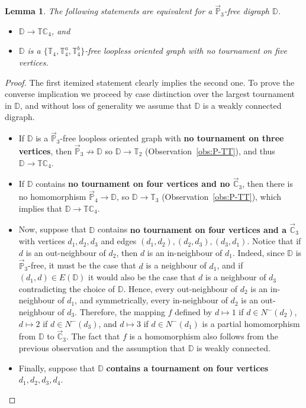 \documentclass{article}
\newtheorem{lemma}[theorem]{Lemma}
\theoremstyle{definition}
\theoremstyle{remark}
\newcommand{\bC}{{\mathbb C}}
\newcommand{\bD}{{\mathbb D}}
\newcommand{\bP}{{\mathbb P}}
\newcommand{\bT}{{\mathbb T}}
\begin{document}
\begin{lemma}\label{lem:TC4-min-obs}
    The following statements are equivalent for a $\vec{\bP}_3$-free digraph $\bD$.
    \begin{itemize}
        \item $\bD\to \bT\bC_4$, and
        \item $\bD$ is a $\{\bT_4,\bT_4^a, \bT_4^b\}$-free loopless oriented graph with no tournament
        on five vertices.
    \end{itemize}
\end{lemma}
\begin{proof}
    The first itemized statement clearly implies the second one.
    To prove the converse implication we proceed by case distinction over the
    largest tournament in $\bD$, and without loss of generality we assume
    that $\bD$ is a weakly connected digraph. 
    \begin{itemize}
        \item If $\bD$ is a $\vec{\bP}_3$-free loopless oriented graph with \textbf{no tournament
        on three vertices}, then $\vec{\bP}_3\not\to \bD$ so $\bD\to \bT_2$ (Observation~\ref{obs:P-TT}),
        and thus $\bD\to \bT\bC_4$.
        \item If $\bD$ contains \textbf{no tournament on four vertices and no ${\vec \bC_3}$}, 
        then there is no homomorphism $\vec{\bP}_4\to \bD$, so $\bD\to \bT_3$ (Observation~\ref{obs:P-TT}),
        which implies that $\bD\to \bT\bC_4$.
        \item Now, suppose that $\bD$ contains \textbf{no tournament on four vertices and a ${\vec \bC_3}$} with
        vertices $d_1,d_2,d_3$ and edges $(d_1,d_2),(d_2,d_3),(d_3,d_1)$.
        Notice that if $d$ is an out-neighbour of $d_2$, then $d$ is an in-neighbour of $d_1$.
        Indeed, since $\bD$ is $\vec{\bP}_3$-free, it must be the case that $d$ is a neighbour
        of $d_1$, and if $(d_1,d)\in E(\bD)$ it would also be the case that $d$ is a neighbour
        of $d_3$ contradicting the choice of $\bD$. Hence, every out-neighbour of $d_2$ is
        an in-neighbour of $d_1$, and symmetrically, every in-neighbour of $d_2$ is an out-neighbour
        of $d_3$. Therefore, the mapping $f$ defined by $d\mapsto 1$ if $d\in N^-(d_2)$, $d\mapsto 2$
        if $d\in N^-(d_3)$, and $d\mapsto 3$ if $d\in N^-(d_1)$ is a partial homomorphism from 
        $\bD$ to $\vec{\bC}_3$. The fact that $f$ is a homomorphism also follows from the previous
        observation and the assumption that $\bD$ is weakly connected.
        \item Finally, suppose that $\bD$ \textbf{contains a tournament on four vertices} $d_1,d_2,d_3,d_4$.

\end{itemize}
\end{proof}
\end{document}
